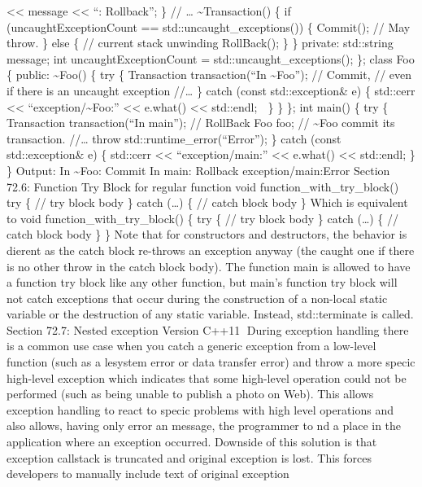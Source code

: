 \textless\textless{} message \textless\textless{} ``: Rollback\n''; \}
// \ldots{} \textasciitilde Transaction() \{ if (uncaughtExceptionCount
== std::uncaught\_exceptions()) \{ Commit(); // May throw. \} else \{ //
current stack unwinding RollBack(); \} \} private: std::string message;
int uncaughtExceptionCount = std::uncaught\_exceptions(); \}; class Foo
\{ public: \textasciitilde Foo() \{ try \{ Transaction transaction(``In
\textasciitilde Foo''); // Commit, // even if there is an uncaught
exception //\ldots{} \} catch (const std::exception\& e) \{ std::cerr
\textless\textless{} ``exception/\textasciitilde Foo:''
\textless\textless{} e.what() \textless\textless{} std::endl;  \} \}
\}; int main() \{ try \{ Transaction transaction(``In main''); //
RollBack Foo foo; // \textasciitilde Foo commit its transaction.
//\ldots{} throw std::runtime\_error(``Error''); \} catch (const
std::exception\& e) \{ std::cerr \textless\textless{}
``exception/main:'' \textless\textless{} e.what() \textless\textless{}
std::endl; \} \} Output: In \textasciitilde Foo: Commit In main:
Rollback exception/main:Error Section 72.6: Function Try Block for
regular function void function\_with\_try\_block() try \{ // try block
body \} catch (\ldots) \{ // catch block body \} Which is equivalent to
void function\_with\_try\_block() \{ try \{ // try block body \} catch
(\ldots) \{ // catch block body \} \} Note that for constructors and
destructors, the behavior is dierent as the catch block re-throws an
exception anyway (the caught one if there is no other throw in the catch
block body). The function main is allowed to have a function try block
like any other function, but main's function try block will not catch
exceptions that occur during the construction of a non-local static
variable or the destruction of any static variable. Instead,
std::terminate is called. Section 72.7: Nested exception Version C++11
During exception handling there is a common use case when you catch a
generic exception from a low-level function (such as a lesystem error or
data transfer error) and throw a more specic high-level exception which
indicates that some high-level operation could not be performed (such as
being unable to publish a photo on Web). This allows exception handling
to react to specic problems with high level operations and also allows,
having only error an message, the programmer to nd a place in the
application where an exception occurred. Downside of this solution is
that exception callstack is truncated and original exception is lost.
This forces developers to manually include text of original exception
